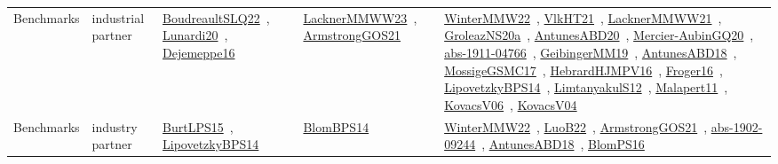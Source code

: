 {\begin{longtable}{lp{3cm}>{\raggedright\arraybackslash}p{6cm}>{\raggedright\arraybackslash}p{6cm}>{\raggedright\arraybackslash}p{8cm}}
Benchmarks & industrial partner & \href{works/BoudreaultSLQ22.pdf}{BoudreaultSLQ22}~\cite{BoudreaultSLQ22}, \href{works/Lunardi20.pdf}{Lunardi20}~\cite{Lunardi20}, \href{works/Dejemeppe16.pdf}{Dejemeppe16}~\cite{Dejemeppe16} & \href{works/LacknerMMWW23.pdf}{LacknerMMWW23}~\cite{LacknerMMWW23}, \href{works/ArmstrongGOS21.pdf}{ArmstrongGOS21}~\cite{ArmstrongGOS21} & \href{works/WinterMMW22.pdf}{WinterMMW22}~\cite{WinterMMW22}, \href{works/VlkHT21.pdf}{VlkHT21}~\cite{VlkHT21}, \href{works/LacknerMMWW21.pdf}{LacknerMMWW21}~\cite{LacknerMMWW21}, \href{works/GroleazNS20a.pdf}{GroleazNS20a}~\cite{GroleazNS20a}, \href{works/AntunesABD20.pdf}{AntunesABD20}~\cite{AntunesABD20}, \href{works/Mercier-AubinGQ20.pdf}{Mercier-AubinGQ20}~\cite{Mercier-AubinGQ20}, \href{works/abs-1911-04766.pdf}{abs-1911-04766}~\cite{abs-1911-04766}, \href{works/GeibingerMM19.pdf}{GeibingerMM19}~\cite{GeibingerMM19}, \href{works/AntunesABD18.pdf}{AntunesABD18}~\cite{AntunesABD18}, \href{works/MossigeGSMC17.pdf}{MossigeGSMC17}~\cite{MossigeGSMC17}, \href{works/HebrardHJMPV16.pdf}{HebrardHJMPV16}~\cite{HebrardHJMPV16}, \href{works/Froger16.pdf}{Froger16}~\cite{Froger16}, \href{works/LipovetzkyBPS14.pdf}{LipovetzkyBPS14}~\cite{LipovetzkyBPS14}, \href{works/LimtanyakulS12.pdf}{LimtanyakulS12}~\cite{LimtanyakulS12}, \href{works/Malapert11.pdf}{Malapert11}~\cite{Malapert11}, \href{works/KovacsV06.pdf}{KovacsV06}~\cite{KovacsV06}, \href{works/KovacsV04.pdf}{KovacsV04}~\cite{KovacsV04}\\
Benchmarks & industry partner & \href{works/BurtLPS15.pdf}{BurtLPS15}~\cite{BurtLPS15}, \href{works/LipovetzkyBPS14.pdf}{LipovetzkyBPS14}~\cite{LipovetzkyBPS14} & \href{works/BlomBPS14.pdf}{BlomBPS14}~\cite{BlomBPS14} & \href{works/WinterMMW22.pdf}{WinterMMW22}~\cite{WinterMMW22}, \href{works/LuoB22.pdf}{LuoB22}~\cite{LuoB22}, \href{works/ArmstrongGOS21.pdf}{ArmstrongGOS21}~\cite{ArmstrongGOS21}, \href{works/abs-1902-09244.pdf}{abs-1902-09244}~\cite{abs-1902-09244}, \href{works/AntunesABD18.pdf}{AntunesABD18}~\cite{AntunesABD18}, \href{works/BlomPS16.pdf}{BlomPS16}~\cite{BlomPS16}\\

\end{longtable}}
